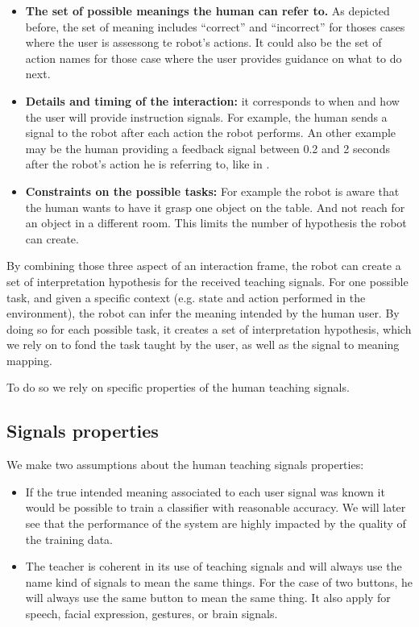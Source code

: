 \begin{itemize}

\item \textbf{The set of possible meanings the human can refer to.} As depicted before, the set of meaning includes ``correct'' and ``incorrect'' for thoses cases where the user is assessong te robot's actions. It could also be the set of action names for those case where the user provides guidance on what to do next.

\item \textbf{Details and timing of the interaction:} it corresponds to when and how the user will provide instruction signals. For example, the human sends a signal to the robot after each action the robot performs. An other example may be the human providing a feedback signal between 0.2 and 2 seconds after the robot's action he is referring to, like in \cite{knox2009interactively}.

\item \textbf{Constraints on the possible tasks:} For example the robot is aware that the human wants to have it grasp one object on the table. And not reach for an object in a different room. This limits the number of hypothesis the robot can create.

\end{itemize}

By combining those three aspect of an interaction frame, the robot can create a set of interpretation hypothesis for the received teaching signals. For one possible task, and given a specific context (e.g. state and action performed in the environment), the robot can infer the meaning intended by the human user. By doing so for each possible task, it creates a set of interpretation hypothesis, which we rely on to fond the task taught by the user, as well as the signal to meaning mapping.

To do so we rely on specific properties of the human teaching signals.

\subsection{Signals properties}
\label{chapter:lfui:signalproperties}

We make two assumptions about the human teaching signals properties:
\begin{itemize}

\item If the true intended meaning associated to each user signal was known it would be possible to train a classifier with reasonable accuracy. We will later see that the performance of the system are highly impacted by the quality of the training data. 

\item The teacher is coherent in its use of teaching signals and will always use the name kind of signals to mean the same things. For the case of two buttons, he will always use the same button to mean the same thing. It also apply for speech, facial expression, gestures, or brain signals. 

\end{itemize}

